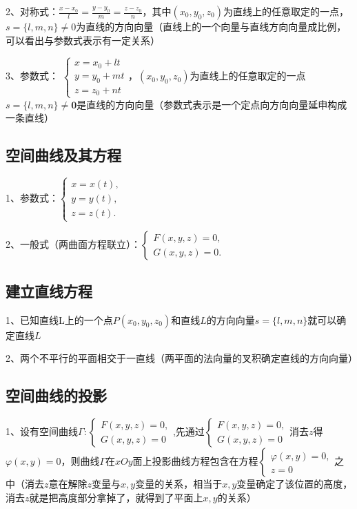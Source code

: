 2、对称式：$\frac{x-x_{0}}{l}=\frac{y-y_{0}}{m}=\frac{z-z_{0}}{n}$，其中$\left(x_{0}, y_{0}, z_{0}\right)$为直线上的任意取定的一点，$s=\{l, m, n\} \neq 0$为直线的方向向量（直线上的一个向量与直线方向向量成比例，可以看出与参数式表示有一定关系）

3、参数式： $\left\{\begin{array}{l}x=x_{0}+l t \\ y=y_{0}+m t \\ z=z_{0}+n t \end{array}\right.$，$\left(x_{0}, y_{0}, z_{0}\right)$为直线上的任意取定的一点$s=\{l, m, n\} \neq \mathbf{0}$是直线的方向向量（参数式表示是一个定点向方向向量延申构成一条直线）



\subsection{空间曲线及其方程}

1、参数式：$\left\{\begin{array}{l}x=x(t), \\ y=y(t), \\ z=z(t) .\end{array}\right.$

2、一般式（两曲面方程联立）：$\left\{\begin{array}{l}F(x, y, z)=0, \\ G(x, y, z)=0 .\end{array}\right.$



\subsection{建立直线方程}

1、已知直线L上的一个点$P\left(x_{0}, y_{0}, z_{0}\right)$和直线$L$的方向向量$s=\{l, m, n\}$就可以确定直线$L$

2、两个不平行的平面相交于一直线（两平面的法向量的叉积确定直线的方向向量）



\subsection{空间曲线的投影}

1、设有空间曲线$\Gamma:\left\{\begin{array}{l}F(x, y, z)=0, \\ G(x, y, z)=0\end{array}\right.$,先通过$\left\{\begin{array}{l}F(x, y, z)=0, \\ G(x, y, z)=0\end{array}\right.$消去$z$得$\varphi(x, y)=0$，则曲线$\Gamma$在$x O y$面上投影曲线方程包含在方程$\left\{\begin{array}{l}\varphi(x, y)=0, \\ z=0\end{array}\right.$之中（消去$z$意在解除$z$变量与$x,y$变量的关系，相当于$x,y$变量确定了该位置的高度，消去$z$就是把高度部分拿掉了，就得到了平面上$x,y$的关系）

